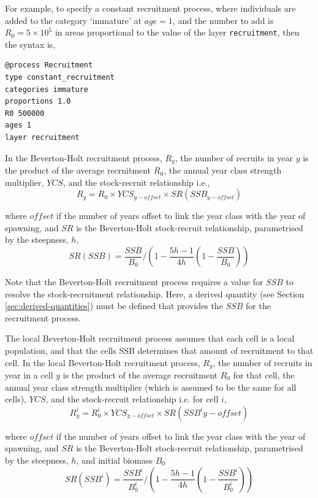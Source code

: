 For example, to specify a constant recruitment process, where individuals are added to the category `immature' at $age=1$, and the number to add is $R_0=5 \times 10^5$ in areas proportional to the value of the layer \texttt{recruitment}, then the syntax is,

\begin{verbatim}
@process Recruitment
type constant_recruitment
categories immature
proportions 1.0
R0 500000
ages 1
layer recruitment
\end{verbatim}

In the Beverton-Holt recruitment process, $R_y$, the number of recruits in year $y$ is the product of the average recruitment $R_0$, the annual year class strength multiplier, $YCS$, and the stock-recruit relationship i.e.,
\begin{equation}
  R_y = R_0 \times YCS_{y-offset} \times SR(SSB_{y-offset})
\end{equation}

where $offset$ if the number of years offset to link the year class with the year of spawning, and $SR$ is the Beverton-Holt stock-recruit relationship, parametrised by the steepness, $h$,
\begin{equation}
SR(SSB) = \frac{SSB}{B_0} / \left( 1-\frac{5h-1}{4h} \left( 1-\frac{SSB}{B_0} \right) \right)
\end{equation}

Note that the Beverton-Holt recruitment process requires a value for $SSB$ to resolve the stock-recruitment relationship. Here, a derived quantity (see Section \ref{sec:derived-quantities}) must be defined that provides the $SSB$ for the recruitment process.

The local Beverton-Holt recruitment process assumes that each cell is a local population, and that the cells SSB determines that amount of recruitment to that cell. In the local Beverton-Holt recruitment process, $R_y$, the number of recruits in year in a cell $y$ is the product of the average recruitment $R_0$ for that cell, the annual year class strength multiplier (which is assumed to be the same for all cells), $YCS$, and the stock-recruit relationship i.e. for cell $i$,
\begin{equation}
  R_y^i = R_0^i \times YCS_{y-offset} \times SR(SSB^i{y-offset})
\end{equation}

where $offset$ if the number of years offset to link the year class with the year of spawning, and $SR$ is the Beverton-Holt stock-recruit relationship, parametrised by the steepness, $h$, and initial biomass $B_0$
\begin{equation}
SR(SSB^i) = \frac{SSB^i}{B_0^i} / \left( 1-\frac{5h-1}{4h} \left( 1-\frac{SSB^i}{B_0^i} \right) \right)
\end{equation}

